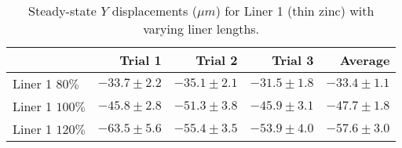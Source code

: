 \begin{table}[htbp!]
\centering
\begin{tabular}{lrrrr}
\toprule
  & Trial 1 & Trial 2 & Trial 3 & Average \\
\midrule
 Liner 1 $80\%$ & $-33.7 \pm 2.2$ & $-35.1 \pm 2.1$ & $-31.5 \pm 1.8$ & $-33.4 \pm 1.1$ \\
 Liner 1 $100\%$ & $-45.8 \pm 2.8$ & $-51.3 \pm 3.8$ & $-45.9 \pm 3.1$ & $-47.7 \pm 1.8$ \\
 Liner 1 $120\%$ & $-63.5 \pm 5.6$ & $-55.4 \pm 3.5$ & $-53.9 \pm 4.0$ & $-57.6 \pm 3.0$ \\
\bottomrule
\end{tabular}
\caption{Steady-state $Y$ displacements ($\mu m$) for Liner 1 (thin zinc) with varying liner lengths.}
\label{fig:liner_1_results_table}
\end{table}